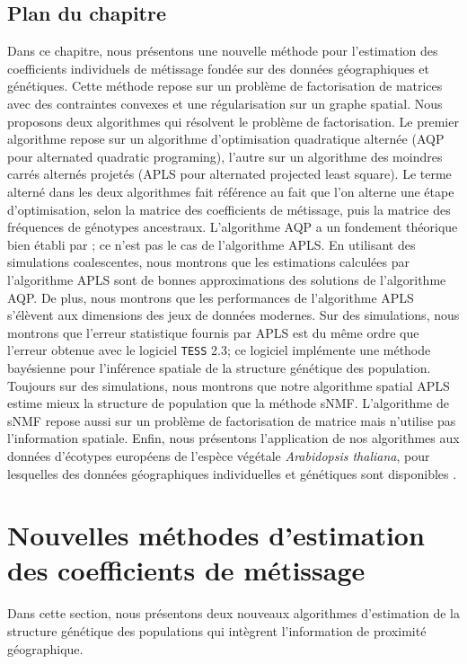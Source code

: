 \documentclass[12pt,a4paper,twoside]{ugathesis}
\begin{document}
\subsection{Plan du chapitre}
\label{sec:org4a8173c}

Dans ce chapitre, nous présentons une nouvelle méthode pour l'estimation des
coefficients individuels de métissage fondée sur des données géographiques et
génétiques. Cette méthode repose sur un problème de factorisation de matrices
avec des contraintes convexes et une régularisation sur un graphe spatial. Nous
proposons deux algorithmes qui résolvent le problème de factorisation. Le
premier algorithme repose sur un algorithme d'optimisation quadratique alternée
(AQP pour alternated quadratic programing), l'autre sur un algorithme des
moindres carrés alternés projetés (APLS pour alternated projected least square).
Le terme alterné dans les deux algorithmes fait référence au fait que l'on
alterne une étape d'optimisation, selon la matrice des coefficients de
métissage, puis la matrice des fréquences de génotypes ancestraux. L'algorithme
AQP a un fondement théorique bien établi par \citet{Bertsekas_1997}; ce n'est pas
le cas de l'algorithme APLS. En utilisant des simulations coalescentes, nous
montrons que les estimations calculées par l'algorithme APLS sont de bonnes
approximations des solutions de l'algorithme AQP. De plus, nous montrons que les
performances de l'algorithme APLS s'élèvent aux dimensions des jeux de données
modernes. Sur des simulations, nous montrons que l'erreur statistique fournis
par APLS est du même ordre que l'erreur obtenue avec le logiciel \texttt{TESS} 2.3; ce
logiciel implémente une méthode bayésienne pour l'inférence spatiale de la
structure génétique des population. Toujours sur des simulations, nous montrons
que notre algorithme spatial APLS estime mieux la structure de population que la
méthode sNMF. L'algorithme de sNMF repose aussi sur un problème de factorisation
de matrice mais n'utilise pas l'information spatiale. Enfin, nous présentons
l'application de nos algorithmes aux données d'écotypes européens de l'espèce
végétale \emph{Arabidopsis thaliana}, pour lesquelles des données géographiques
individuelles et génétiques sont disponibles \citep{Horton_2012}.

\section{Nouvelles méthodes d'estimation des coefficients de métissage}
\label{sec:orgb222cf4}
Dans cette section, nous présentons deux nouveaux algorithmes d'estimation de la
structure génétique des populations qui intègrent l'information de proximité
géographique.
\end{document}
